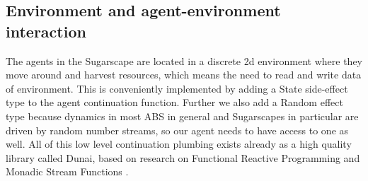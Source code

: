 \subsection{Environment and agent-environment interaction}
The agents in the Sugarscape are located in a discrete 2d environment where they move around and harvest resources, which means the need to read and write data of environment. This is conveniently implemented by adding a State side-effect type to the agent continuation function. Further we also add a Random effect type because dynamics in most ABS in general and Sugarscapes in particular are driven by random number streams, so our agent needs to have access to one as well. All of this low level continuation plumbing exists already as a high quality library called Dunai, based on research on Functional Reactive Programming  \cite{hudak_arrows_2003} and Monadic Stream Functions \cite{perez_functional_2016,perez_extensible_2017}.
